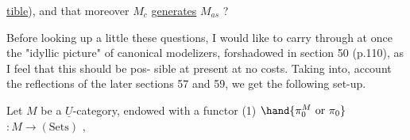 
\uline{tible}), and that moreover $M_c$ \uline{generates} $M_{as}$ ?


Before looking up a little these questions, I would like   to
carry through at once the "idyllic picture" of canonical modelizers,
 forshadowed in section 50 (p.110), as I feel that this should be pos-%
sible at present at no costs. Taking into, account the reflections of
the later sections 57 and 59, we get the following set-up.

Let $M$ be a $\underline{U}$-category, endowed with a functor
(1) \quad $\hand{\pi_0^M \text{ or } \pi_0}$  $: M \longrightarrow (\mathrm{Sets})$ ,

